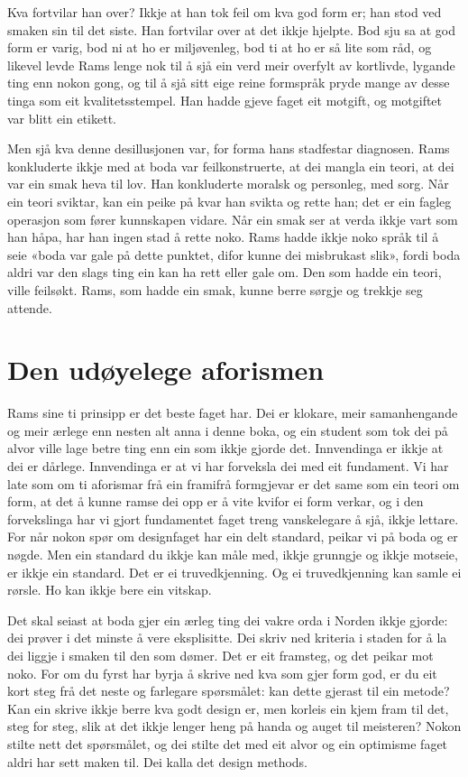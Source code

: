 Kva fortvilar han over? Ikkje at han tok feil om kva god form er; han stod ved smaken sin til det siste. Han fortvilar over at det ikkje hjelpte. Bod sju sa at god form er varig, bod ni at ho er miljøvenleg, bod ti at ho er så lite som råd, og likevel levde Rams lenge nok til å sjå ein verd meir overfylt av kortlivde, lygande ting enn nokon gong, og til å sjå sitt eige reine formspråk pryde mange av desse tinga som eit kvalitetsstempel. Han hadde gjeve faget eit motgift, og motgiftet var blitt ein etikett.

Men sjå kva denne desillusjonen var, for forma hans stadfestar diagnosen. Rams konkluderte ikkje med at boda var feilkonstruerte, at dei mangla ein teori, at dei var ein smak heva til lov. Han konkluderte moralsk og personleg, med sorg. Når ein teori sviktar, kan ein peike på kvar han svikta og rette han; det er ein fagleg operasjon som fører kunnskapen vidare. Når ein smak ser at verda ikkje vart som han håpa, har han ingen stad å rette noko. Rams hadde ikkje noko språk til å seie «boda var gale på dette punktet, difor kunne dei misbrukast slik», fordi boda aldri var den slags ting ein kan ha rett eller gale om. Den som hadde ein teori, ville feilsøkt. Rams, som hadde ein smak, kunne berre sørgje og trekkje seg attende.

\section{Den udøyelege aforismen}

Rams sine ti prinsipp er det beste faget har. Dei er klokare, meir samanhengande og meir ærlege enn nesten alt anna i denne boka, og ein student som tok dei på alvor ville lage betre ting enn ein som ikkje gjorde det. Innvendinga er ikkje at dei er dårlege. Innvendinga er at vi har forveksla dei med eit fundament. Vi har late som om ti aforismar frå ein framifrå formgjevar er det same som ein teori om form, at det å kunne ramse dei opp er å vite kvifor ei form verkar, og i den forvekslinga har vi gjort fundamentet faget treng vanskelegare å sjå, ikkje lettare. For når nokon spør om designfaget har ein delt standard, peikar vi på boda og er nøgde. Men ein standard du ikkje kan måle med, ikkje grunngje og ikkje motseie, er ikkje ein standard. Det er ei truvedkjenning. Og ei truvedkjenning kan samle ei rørsle. Ho kan ikkje bere ein vitskap.

Det skal seiast at boda gjer ein ærleg ting dei vakre orda i Norden ikkje gjorde: dei prøver i det minste å vere eksplisitte. Dei skriv ned kriteria i staden for å la dei liggje i smaken til den som dømer. Det er eit framsteg, og det peikar mot noko. For om du fyrst har byrja å skrive ned kva som gjer form god, er du eit kort steg frå det neste og farlegare spørsmålet: kan dette gjerast til ein metode? Kan ein skrive ikkje berre kva godt design er, men korleis ein kjem fram til det, steg for steg, slik at det ikkje lenger heng på handa og auget til meisteren? Nokon stilte nett det spørsmålet, og dei stilte det med eit alvor og ein optimisme faget aldri har sett maken til. Dei kalla det design methods.

